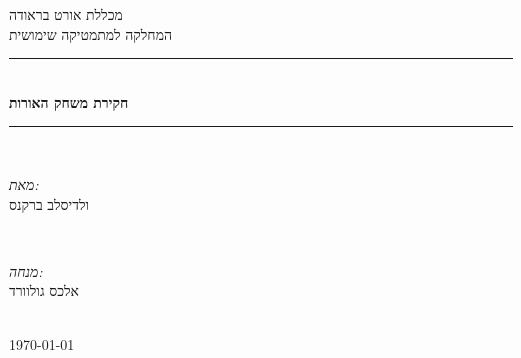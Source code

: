 \documentclass[12pt,twoside]{article}
\begin{document}
\begin{titlepage}
	
\newcommand{\HRule}{\rule{\linewidth}{0.5mm}} %

\center %


\textsc{\LARGE   
מכללת אורט בראודה
}\\[1.5cm]
\textsc{\LARGE 
המחלקה למתמטיקה שימושית
}\\[0.5cm]


\HRule \\[0.4cm]
{ \huge \bfseries
חקירת משחק האורות
 }\\[0.4cm] 
\HRule \\[1.5cm]


\begin{minipage}{0.4\textwidth}
\begin{flushleft} \large
\emph{מאת:}\\
ולדיסלב ברקנס
\end{flushleft}
\end{minipage}
~
\begin{minipage}{0.4\textwidth}
\begin{flushright} \large
\emph{מנחה:} \\
אלכס גולוורד 
\end{flushright}
\end{minipage}\\[2cm]

{\large \today}\\[2cm] %
\begin{figure}
	\begin{center}
	\end{center}
\end{figure}


\end{titlepage}
\end{document}
